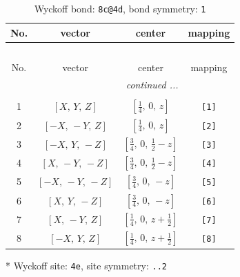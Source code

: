 \documentclass[fleqn,8pt]{jsarticle}
\begin{document}
\renewcommand{\arraystretch}{1.2}
\begin{longtable}{cccc}
\caption{Wyckoff bond: {\tt 8c@4d}, bond symmetry: {\tt 1}}
 \\
 \hline \hline
No. & vector & center & mapping \\ \hline \endfirsthead

\multicolumn{3}{l}{\tablename\ \thetable{}} \\
 \hline \hline
No. & vector & center & mapping \\ \hline \endhead

 \hline \hline
\multicolumn{3}{r}{\footnotesize\it continued ...} \\ \endfoot

 \hline \hline
\multicolumn{3}{r}{} \\ \endlastfoot

1 & $\left[ X,\, Y,\, Z \right]$ & $\left[ \frac{1}{4},\, 0,\, z \right]$ & {\tt [1]} \\ \hline
2 & $\left[ - X,\, - Y,\, Z \right]$ & $\left[ \frac{1}{4},\, 0,\, z \right]$ & {\tt [2]} \\ \hline
3 & $\left[ - X,\, Y,\, - Z \right]$ & $\left[ \frac{3}{4},\, 0,\, \frac{1}{2} - z \right]$ & {\tt [3]} \\ \hline
4 & $\left[ X,\, - Y,\, - Z \right]$ & $\left[ \frac{3}{4},\, 0,\, \frac{1}{2} - z \right]$ & {\tt [4]} \\ \hline
5 & $\left[ - X,\, - Y,\, - Z \right]$ & $\left[ \frac{3}{4},\, 0,\, - z \right]$ & {\tt [5]} \\ \hline
6 & $\left[ X,\, Y,\, - Z \right]$ & $\left[ \frac{3}{4},\, 0,\, - z \right]$ & {\tt [6]} \\ \hline
7 & $\left[ X,\, - Y,\, Z \right]$ & $\left[ \frac{1}{4},\, 0,\, z + \frac{1}{2} \right]$ & {\tt [7]} \\ \hline
8 & $\left[ - X,\, Y,\, Z \right]$ & $\left[ \frac{1}{4},\, 0,\, z + \frac{1}{2} \right]$ & {\tt [8]} \\
\end{longtable}
* Wyckoff site: {\tt 4e}, site symmetry: {\tt ..2}
\renewcommand{\arraystretch}{1.2}
\end{document}
